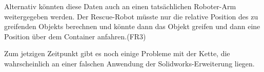 Alternativ könnten diese Daten auch an einen tatsächlichen Roboter-Arm weitergegeben werden.
Der Rescue-Robot müsste nur die relative Position des zu greifenden Objekts berechnen
und könnte dann das Objekt greifen und dann eine Position über dem Container anfahren.(FR3)

Zum jetzigen Zeitpunkt gibt es noch einige Probleme mit der Kette,
die wahrscheinlich an einer falschen Anwendung der Solidworks-Erweiterung liegen.
